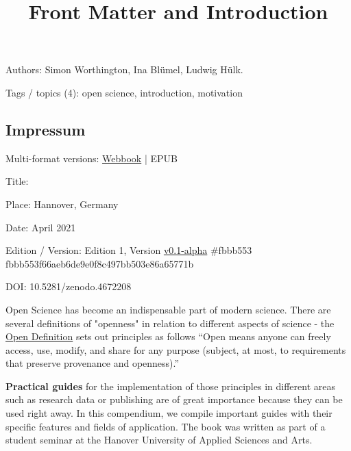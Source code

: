 \documentclass{article}
\begin{document}
\title{Front Matter and Introduction}

\maketitle


Authors: Simon Worthington, Ina Blümel, Ludwig Hülk.


Tags / topics (4): open science, introduction, motivation


\subsection{Impressum}\label{H8810070}



Multi-format versions: \href{https://vivliostyle.vercel.app/#src=https://tibhannover.github.io/Open-Science-Guides-Collection/html/index.html&bookMode=true}{Webbook} | EPUB


Title: 


Place: Hannover, Germany


Date: April 2021


Edition / Version: Edition 1, Version \href{https://github.com/TIBHannover/Open-Science-Guides-Collection/releases/tag/v0.1-alpha}{v0.1-alpha} \#fbbb553 fbbb553f66aeb6de9e0f8c497bb503e86a65771b


DOI: 10.5281/zenodo.4672208


Open Science has become an indispensable part of modern science. There are several definitions of "openness" in relation to different aspects of science - the \href{https://opendefinition.org/}{Open Definition} sets out principles as follows “Open means anyone can freely access, use, modify, and share for any purpose (subject, at most, to requirements that preserve provenance and openness).” 


\textbf{Practical guides} for the implementation of those principles in different areas such as research data or publishing are of great importance because they can be used right away. In this compendium, we compile important guides with their specific features and fields of application. The book was written as part of a student seminar at the Hanover University of Applied Sciences and Arts.
\end{document}
